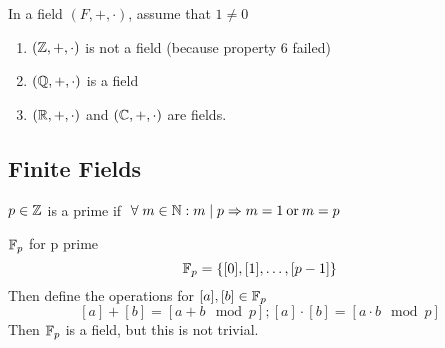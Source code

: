 \begin{remark}
    In a field \((F, +, \cdot)\), assume that \(1\neq 0\)
\end{remark}
\begin{example}
    \hfill
    \begin{enumerate}
        \item \((\mathbb{Z}, +, \cdot)\) is not a field (because property 6 failed)
        \item  \((\mathbb{Q}, +, \cdot)\) is a field
        \item \((\mathbb{R}, +, \cdot)\) and \((\mathbb{C}, +, \cdot)\) are fields.
    \end{enumerate}
\end{example}

\subsection{Finite Fields}
\begin{recall}
    \(p\in \mathbb{Z}\) is a prime if \(\forall m\in \bbn: m \mid p \implies m = 1 \:\text{or}\:  m = p\)
\end{recall}
\begin{definition} {\(\mathbb{F}_p\) for p prime}
    \[
        \mathbb{F}_p = \{[0], [1], \dots, [p-1]\}
    \]
    Then define the operations for \([a], [b] \in \mathbb{F}_p\)
    \[
        [a] + [b] = [a + b \mod p]; [a] \cdot [b] = [a \cdot b \mod p]
    \]
    Then \(\mathbb{F}_p\) is a field, but this is not trivial.
\end{definition}

